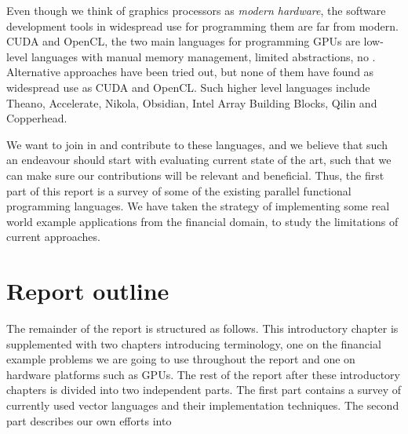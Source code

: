 Even though we think of graphics processors as \textit{modern
  hardware}, the software development tools in widespread use for
programming them are far from modern. CUDA and OpenCL, the two main
languages for programming GPUs are low-level languages with manual
memory management, limited abstractions, no . Alternative approaches have been tried out, but none of them
have found as widespread use as CUDA and OpenCL. Such higher level
languages include Theano, Accelerate, Nikola, Obsidian, Intel Array
Building Blocks, Qilin and Copperhead.


We want to join in and contribute to these languages, and we believe
that such an endeavour should start with evaluating current state of
the art, such that we can make sure our contributions will be relevant
and beneficial. Thus, the first part of this report is a survey of
some of the existing parallel functional programming languages. We
have taken the strategy of implementing some real world example
applications from the financial domain, to study the limitations of
current approaches.


\section{Report outline}
The remainder of the report is structured as follows. This
introductory chapter is supplemented with two chapters introducing
terminology, one on the financial example problems we are going to use
throughout the report and one on hardware platforms such as GPUs. The
rest of the report after these introductory chapters is divided into
two independent parts. The first part contains a survey of currently
used vector languages and their implementation techniques. The second
part describes our own efforts into \todo{\ldots}

